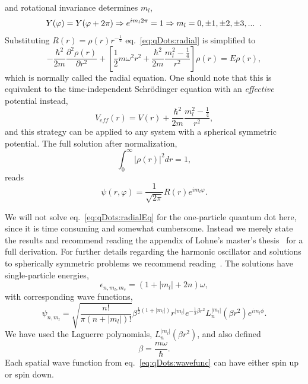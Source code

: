 and rotational invariance determines $m_l$,
\begin{equation}
Y(\varphi) = Y(\varphi + 2\pi) 
\Rightarrow 
e^{im_l 2\pi} = 1
\Rightarrow
m_l = 0,\pm 1,\pm 2, \pm 3, ...   \hspace{2mm}.
\end{equation}
Substituting $R(r) = \rho(r) r^{-\frac{1}{2}}$ eq.~\eqref{eq:qDots:radial} is simplified to
\begin{equation}
\label{eq:qDots:radialEq}
- \frac{\hbar^2}{2m} \frac{\partial^2 \rho(r)}{\partial r^2}
+
\left[
\frac{1}{2} m \omega^2 r^2 
+
\frac{\hbar^2}{2m} \frac{m_l^2 - \frac{1}{4}}{r^2}
\right]\rho(r)
=
E \rho(r) ,
\end{equation}
which is normally called the radial equation.
One should note that this is equivalent to the time-independent Schrödinger equation with an \textit{effective} potential instead,
\begin{equation}
 V_{eff}(r) = V(r) +
\frac{\hbar^2}{2m} \frac{m_l^2 - \frac{1}{4}}{r^2},
\end{equation}
and this strategy can be applied to any system with a spherical symmetric potential.
The full solution after normalization,
\begin{equation}
\int_0^{\infty} |\rho(r) |^2 dr = 1,
\end{equation}
reads
\begin{equation}
\psi(r,\varphi) = \frac{1}{\sqrt{2\pi}} R(r)  e^{im_l \varphi}.
\end{equation}

We will not solve eq.~\eqref{eq:qDots:radialEq} for the one-particle quantum dot here, since it is time consuming and somewhat cumbersome.
Instead we merely state the results and recommend reading the appendix of Lohne's master's thesis~\cite{mplohne} for a full derivation.
For further details regarding the harmonic oscillator and solutions to spherically symmetric problems we recommend reading~\cite{griffiths}.
The solutions have single-particle energies,
\begin{equation}
\label{eq:qDots:spEnergies}
\epsilon_{n,m_l,m_s} = \left( 1 + |m_l|  + 2 n\right) \omega ,
\end{equation}
with corresponding wave functions,
\begin{equation}
\label{eq:qDots:wavefunc}
\psi_{n,m_l} 
=
\sqrt{\frac{n!}{\pi \left( n + |m_l| \right) !}}
\beta^{\frac{1}{2}\left( 1 + |m_l|\right)}
r^{|m_l|}
e^{-\frac{1}{2}\beta r^2}
L_n^{|m_l|}\left( \beta r^2 \right)
e^{im_l\phi} .
\end{equation}
We have used the Laguerre polynomials, $L_n^{|m_l|}(\beta r^2)$, and also defined
\begin{equation}
\beta = \frac{m \omega}{\hbar}.
\end{equation}
Each spatial wave function from eq.~\eqref{eq:qDots:wavefunc} can have either spin up or spin down.






